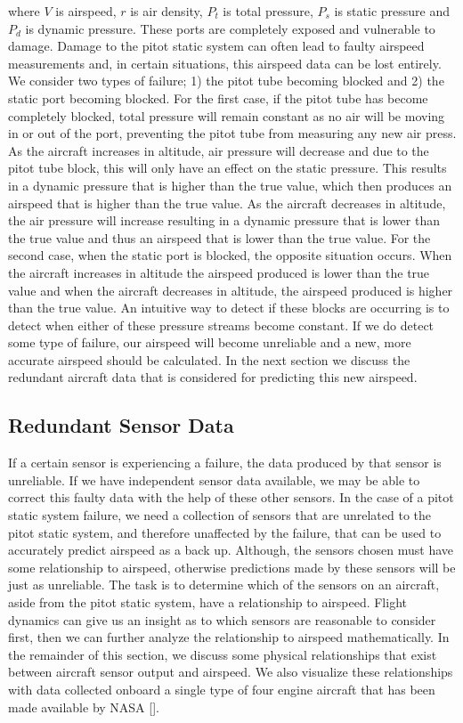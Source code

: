 \documentclass[]{aiaa-tc}
\begin{document}
where $V$ is airspeed, $r$ is air density, $P_t$ is total pressure, $P_s$ is static pressure and $P_d$ is dynamic pressure. These ports are completely exposed and vulnerable to damage. Damage to the pitot static system can often lead to faulty airspeed measurements and, in certain situations, this airspeed data can be lost entirely. We consider two types of failure; 1) the pitot tube becoming blocked and 2) the static port becoming blocked. For the first case, if the pitot tube has become completely blocked, total pressure will remain constant as no air will be moving in or out of the port, preventing the pitot tube from measuring any new air press. As the aircraft increases in altitude, air pressure will decrease and due to the pitot tube block, this will only have an effect on the static pressure. This results in a dynamic pressure that is higher than the true value, which then produces an airspeed that is higher than the true value. As the aircraft decreases in altitude, the air pressure will increase resulting in a dynamic pressure that is lower than the true value and thus an airspeed that is lower than the true value. For the second case, when the static port is blocked, the opposite situation occurs. When the aircraft increases in altitude the airspeed produced is lower than the true value and when the aircraft decreases in altitude, the airspeed produced is higher than the true value. An intuitive way to detect if these blocks are occurring is to detect when either of these pressure streams become constant. If we do detect some type of failure, our airspeed will become unreliable and a new, more accurate airspeed should be calculated. In the next section we discuss the redundant aircraft data that is considered for predicting this new airspeed. 

\subsection{Redundant Sensor Data}
\label{sec:redundantSensorData}
If a certain sensor is experiencing a failure, the data produced by that sensor is unreliable. If we have independent sensor data available, we may be able to correct this faulty data with the help of these other sensors. In the case of a pitot static system failure, we need a collection of sensors that are unrelated to the pitot static system, and therefore unaffected by the failure, that can be used to accurately predict airspeed as a back up. Although, the sensors chosen must have some relationship to airspeed, otherwise predictions made by these sensors will be just as unreliable. The task is to determine which of the sensors on an aircraft, aside from the pitot static system, have a relationship to airspeed. Flight dynamics can give us an insight as to which sensors are reasonable to consider first, then we can further analyze the relationship to airspeed mathematically. In the remainder of this section, we discuss some physical relationships that exist between aircraft sensor output and airspeed. We also visualize these relationships with data collected onboard a single type of four engine aircraft that has been made available by NASA [].
\end{document}
